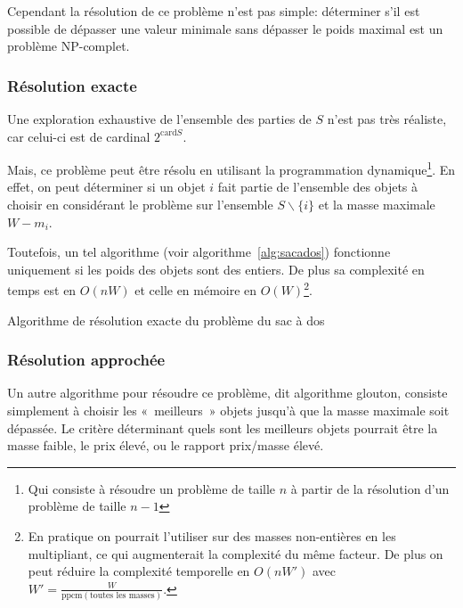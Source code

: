     Cependant la résolution de ce problème n'est pas simple: déterminer s'il
    est possible de dépasser une valeur minimale sans dépasser le poids maximal
    est un problème NP\nobreakdash-complet.

  \subsubsection{Résolution exacte}
    Une exploration exhaustive de l'ensemble des parties de $S$ n'est pas très
    réaliste, car celui-ci est de cardinal $2^{\mathrm{card} S}$.

    Mais, ce problème peut être résolu en utilisant la programmation
    dynamique\footnote{Qui consiste à résoudre un problème de taille $n$ à
    partir de la résolution d'un problème de taille $n-1$}. En effet, on peut
    déterminer si un objet $i$ fait partie de l'ensemble des objets à choisir en
    considérant le problème sur l'ensemble $S\backslash\{i\}$ et la masse
    maximale $W-m_i$.
    
    Toutefois, un tel algorithme (voir algorithme~\ref{alg:sacados}) fonctionne
    uniquement si les poids des objets
    sont des entiers. De plus sa complexité en temps est en $O(nW)$ et celle en
    mémoire en $O(W)$\footnote{En pratique on pourrait l'utiliser sur des
    masses non-entières en les multipliant, ce qui augmenterait la complexité
    du même facteur. De plus on peut réduire la complexité temporelle en
    $O(nW')$ avec $W' = \frac W {\mathrm{ppcm}(\text{toutes les masses})}$.}.

    \begin{algorithm}
      \caption{Algorithme de résolution exacte du problème du sac à dos}
      \label{alg:sacados}
    \end{algorithm}

  \subsubsection{Résolution approchée}
    Un autre algorithme pour résoudre ce problème, dit algorithme glouton,
    consiste simplement à choisir les «~meilleurs~» objets jusqu'à que la masse
    maximale soit dépassée. Le critère déterminant quels sont les meilleurs
    objets pourrait être la masse faible, le prix élevé, ou le rapport
    prix/masse élevé.

